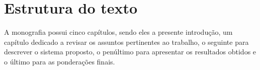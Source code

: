 \section{Estrutura do texto}
{ A monografia possui cinco capítulos, sendo eles a presente introdução, um
    capítulo dedicado a revisar os assuntos pertinentes ao trabalho, o seguinte
    para descrever o sistema proposto, o penúltimo para apresentar os resultados
    obtidos e o último para as ponderações finais.
}

